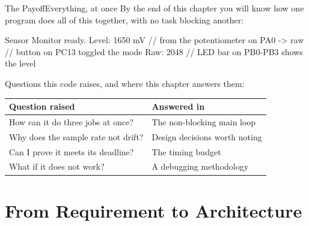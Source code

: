 \documentclass[9pt,aspectratio=169,xcolor=table]{beamer}
\begin{document}
{\beamerextras
\begin{frame}[fragile]{The Payoff}{Everything, at once}
    \leavevmode
    By the end of this chapter you will know how one program does all of this together, with no task blocking another:

    \vspace{2mm}
    \begin{center}
    \begin{minipage}{.9\textwidth}
\begin{cc}[basicstyle=\ttfamily\small]
Sensor Monitor ready.
Level: 1650 mV          // from the potentiometer on PA0
-> raw                  // button on PC13 toggled the mode
Raw:   2048             // LED bar on PB0-PB3 shows the level
\end{cc}
    \end{minipage}
    \end{center}

    \vspace{2mm}
    {\small Questions this code raises, and where this chapter answers them:}

    \vspace{1mm}
    \begin{center}
    {\small
    \striped
    \begin{tabular}{@{}l R{.52\textwidth}@{}}
        \toprule
        \textbf{Question raised} & \textbf{Answered in} \\
        \midrule
        How can it do three jobs at once? & The non-blocking main loop \\
        Why does the sample rate not drift? & Design decisions worth noting \\
        Can I prove it meets its deadline? & The timing budget \\
        What if it does not work? & A debugging methodology \\
        \bottomrule
    \end{tabular}}
    \end{center}
\end{frame}
}


\section{From Requirement to Architecture}
\end{document}
